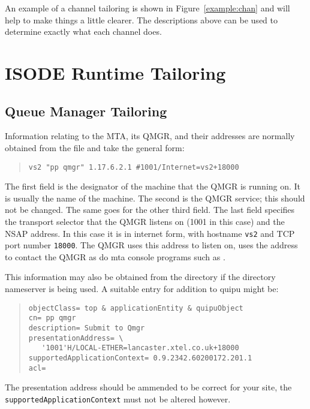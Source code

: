 An example of a channel tailoring is shown in
Figure~\ref{example:chan} and will help to make things a little clearer.
The descriptions above can be used to determine exactly what each
channel does.

\clearpage

\section {ISODE Runtime Tailoring}

\subsection{Queue Manager Tailoring}
Information relating to the MTA, its QMGR, and their
addresses are normally obtained from the file 
 and take the general form:
\begin{quote}\small\begin{verbatim}
vs2 "pp qmgr" 1.17.6.2.1 #1001/Internet=vs2+18000
\end{verbatim}\end{quote}

The first field is the designator of the machine that the QMGR
is running on. It is usually the name of the machine. The second is
the QMGR service; this should not be changed.  The same goes for the
other third field. The last field specifies the transport
selector that the QMGR listens on (1001 in this case) and the NSAP
address. In this case it is in internet form, with hostname \verb|vs2|
and TCP port number \verb|18000|. The QMGR uses this address to listen
on,  uses the address to contact the QMGR as do mta
console programs such as .

This information may also be obtained from the directory if the
directory nameserver is being used. A suitable
entry for addition to quipu might be:
\begin{quote}\begin{verbatim}
objectClass= top & applicationEntity & quipuObject
cn= pp qmgr
description= Submit to Qmgr
presentationAddress= \
   '1001'H/LOCAL-ETHER=lancaster.xtel.co.uk+18000
supportedApplicationContext= 0.9.2342.60200172.201.1
acl=
\end{verbatim}\end{quote}
The presentation address should be ammended to be correct for your
site, the {\verb|supportedApplicationContext|}
must not be altered however.

